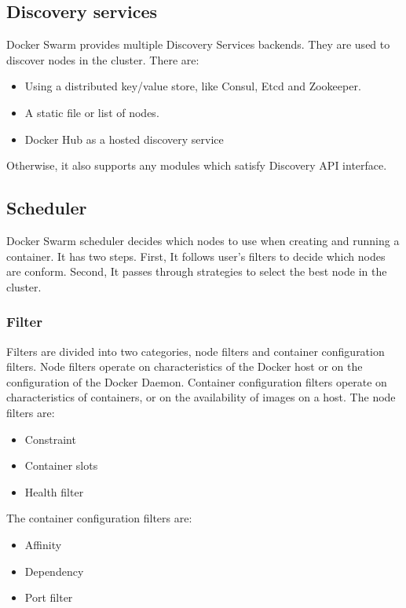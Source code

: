 \subsection{Discovery services}
Docker Swarm provides multiple Discovery Services backends. They are used to discover nodes in the cluster. There are:
\begin{itemize}
    \item Using a distributed key/value store, like Consul, Etcd and Zookeeper.
    \item A static file or list of nodes.
    \item Docker Hub as a hosted discovery service
\end{itemize}
Otherwise, it also supports any modules which satisfy Discovery API interface.

\subsection{Scheduler}
Docker Swarm scheduler decides which nodes to use when creating and running a container. It has two steps.
First, It follows user's filters to decide which nodes are conform.
Second, It passes through strategies to select the best node in the cluster.

\subsubsection{Filter}
Filters are divided into two categories, node filters and container configuration filters. Node filters operate on characteristics of the Docker host or on the configuration of the Docker Daemon.
Container configuration filters operate on characteristics of containers, or on the availability of images on a host.
The node filters are:
\begin{itemize}
    \item Constraint
    \item Container slots
    \item Health filter
\end{itemize}
The container configuration filters are:
\begin{itemize}
    \item Affinity
    \item Dependency
    \item Port filter
\end{itemize}

